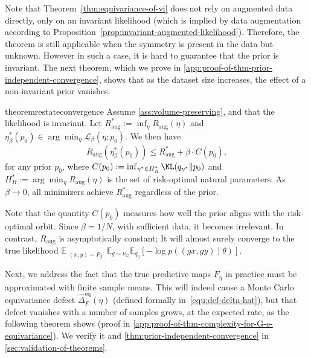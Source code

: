 \documentclass{article}
\begin{document}
Note that Theorem~\ref{thm:equivariance-of-vi} does not rely on augmented data directly, only on an invariant likelihood (which is implied by data augmentation according to Proposition~\ref{prop:invariant-augmented-likelihood}). Therefore, the theorem is still applicable when the symmetry is present in the data but unknown.
However in such a case, it is hard to guarantee that the prior is invariant. The next theorem, which we prove in \cref{app:proof-of-thm-prior-independent-convergence}, shows that as the dataset size increases, the effect of a non-invariant prior vanishes.



\begin{restatable}{theorem}{restateconvergence}
\label{thm:prior-independent-convergence}
Assume \cref{ass:volume-preserving}, and that the likelihood is invariant. Let $R^{\ast}_{\mathrm{aug}}:= \inf_{\eta}R_{\mathrm{aug}}(\eta)$ and $\eta^{\ast}_{\beta}(p_{0})\in\arg\min_{\eta}\mathcal{L}_{\beta}(\eta; p_{0})$.
We then have 
\begin{equation}
    R_{\mathrm{aug}}(\eta^{\ast}_{\beta}(p_{0})) 
    \leq R^{\ast}_{\mathrm{aug}} 
    + \beta \cdot C(p_{0}),
\end{equation}
for any prior $p_{0}$, where $C(p_{0}) := \inf_{\eta^{\ast} \in H^{\ast}_{R}} \KL(q_{\eta^{\ast}} \Vert p_{0})$ and $H^{\ast}_{R} := \arg\min_{\eta} R_{\mathrm{aug}}(\eta)$ is the set of risk-optimal natural parameters. As $\beta \to 0$, all minimizers achieve $R^{\ast}_{\mathrm{aug}}$ regardless of the prior.
\end{restatable}

Note that the quantity $C(p_{0})$ measures how well the prior aligns with the risk-optimal orbit. Since $\beta = 1/N$, with sufficient data, it becomes irrelevant. In contrast, $R_{\mathrm{aug}}$ is asymptotically constant; It will almost surely converge to the true likelihood $\mathbb{E}_{\substack{(x,y)\sim P_{\mathcal{X}}}}\mathbb{E}_{g\sim \nu_G}\mathbb{E}_{q_{\eta}}[-\log p((gx,gy) \mid \theta)]$.

Next, we address the fact that the true predictive maps $F_\eta$ in practice must be approximated with finite sample means. This will indeed cause a Monte Carlo equivariance defect $\widehat{\Delta}^{\mathrm{eq}}_{F}(\eta)$ (defined formally in~\eqref{equ:def-delta-hat}), but that defect vanishes with a number of samples grows, at the expected rate, as the following theorem shows (proof in \cref{app:proof-of-thm-complexity-for-G-e-equivariance}). We verify it and \cref{thm:prior-independent-convergence} in \cref{sec:validation-of-theorems}.
\end{document}
